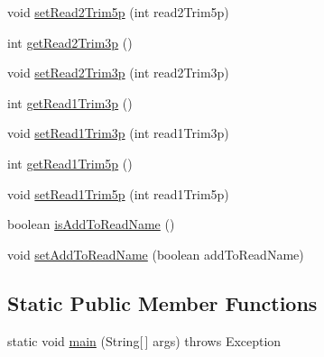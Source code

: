 \begin{DoxyCompactItemize}
\item 
void \hyperlink{classbroad_1_1pda_1_1seq_1_1fastq_1_1_fastq_splitter_by_barcode_a2f1c8cefd18b213f99447447d30128cd}{set\+Read2\+Trim5p} (int read2\+Trim5p)
\item 
int \hyperlink{classbroad_1_1pda_1_1seq_1_1fastq_1_1_fastq_splitter_by_barcode_a61ee9709c707ae1f7fdbb05dcb887b41}{get\+Read2\+Trim3p} ()
\item 
void \hyperlink{classbroad_1_1pda_1_1seq_1_1fastq_1_1_fastq_splitter_by_barcode_ae8008497bf67308fdbba0cc9811a890d}{set\+Read2\+Trim3p} (int read2\+Trim3p)
\item 
int \hyperlink{classbroad_1_1pda_1_1seq_1_1fastq_1_1_fastq_splitter_by_barcode_a2d02fb9d2e05002de4a9a04e7256af3f}{get\+Read1\+Trim3p} ()
\item 
void \hyperlink{classbroad_1_1pda_1_1seq_1_1fastq_1_1_fastq_splitter_by_barcode_a55cd9f227332e8b25ee4ba3a0a6a5b57}{set\+Read1\+Trim3p} (int read1\+Trim3p)
\item 
int \hyperlink{classbroad_1_1pda_1_1seq_1_1fastq_1_1_fastq_splitter_by_barcode_a49f2f853bde9c90cacc3ad97708f4f56}{get\+Read1\+Trim5p} ()
\item 
void \hyperlink{classbroad_1_1pda_1_1seq_1_1fastq_1_1_fastq_splitter_by_barcode_a820e85f24d137a4310f282bd4a4eedb6}{set\+Read1\+Trim5p} (int read1\+Trim5p)
\item 
boolean \hyperlink{classbroad_1_1pda_1_1seq_1_1fastq_1_1_fastq_splitter_by_barcode_a10e5fbabd644209fbe126f200f5f0fff}{is\+Add\+To\+Read\+Name} ()
\item 
void \hyperlink{classbroad_1_1pda_1_1seq_1_1fastq_1_1_fastq_splitter_by_barcode_a9128e093c39f027a4c8fa9b71df443c3}{set\+Add\+To\+Read\+Name} (boolean add\+To\+Read\+Name)
\end{DoxyCompactItemize}
\subsection*{Static Public Member Functions}
\begin{DoxyCompactItemize}
\item 
static void \hyperlink{classbroad_1_1pda_1_1seq_1_1fastq_1_1_fastq_splitter_by_barcode_a25fa89de279fd99b719da59cfd89bce2}{main} (String\mbox{[}$\,$\mbox{]} args)  throws Exception 
\end{DoxyCompactItemize}

